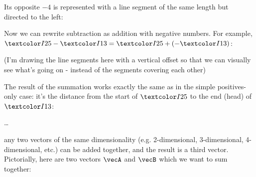 \begin{descitemize}
	\begin{center}
	\end{center}

	Its opposite $-4$ is represented with a line segment of the same length but directed to the left:
	\begin{center}
	\end{center}

	Now we can rewrite subtraction as addition with negative numbers. For example, $\five-\three = \five + (-\three)$:
	\begin{center}
	\end{center}
	(I'm drawing the line segments here with a vertical offset so that we can visually see what's going on - instead of the segments covering each other)

	The result of the summation works exactly the same as in the simple positives-only case: it's the distance from the start of $\five$ to the end (head) of $\three$:
	\begin{center}
	\end{center}

	\dots

	any two vectors of the same dimensionality (e.g. 2-dimensional, 3-dimensional, 4-dimensional, etc.) can be added together, and the result is a third vector. Pictorially, here are two vectors $\vecA$ and $\vecB$ which we want to sum together:


\end{descitemize}
